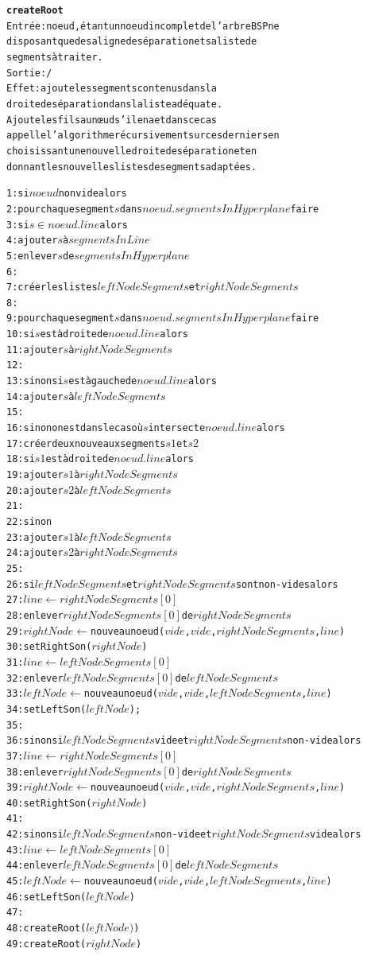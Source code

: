 \documentclass[11pt,a4paper]{article}
\theoremstyle{definition}
\theoremstyle{remark}
\begin{document}
\begin{alltt}
\textbf{createRoot}
Entrée : noeud, étant un noeud incomplet de l'arbre BSP ne
disposant que de sa ligne de séparation et sa liste de
segments à traiter.
Sortie : /
Effet : ajoute les segments contenus dans la 
droite de séparation dans la liste adéquate.
Ajoute les fils au nœud s'il en a et dans ce cas 
appelle l'algorithme récursivement sur ces derniers en 
choisissant une nouvelle droite de séparation et en 
donnant les nouvelles listes de segments adaptées.

 1: si \(noeud\) non vide alors
 2:   pour chaque segment \(s\) dans \(noeud.segmentsInHyperplane\) faire
 3:     si \(s \in noeud.line\) alors
 4:       ajouter \(s\) à \(segmentsInLine\)
 5:       enlever \(s\) de \(segmentsInHyperplane\)
 6:       
 7:   créer les listes \(leftNodeSegments\) et \(rightNodeSegments\)
 8:   
 9:   pour chaque segment \(s\) dans \(noeud.segmentsInHyperplane\) faire
10:     si \(s\) est à droite de \(noeud.line\) alors
11:       ajouter \(s\) à \(rightNodeSegments\)
12:
13:     sinon si \(s\) est à gauche de \(noeud.line\) alors
14:       ajouter \(s\) à \(leftNodeSegments\)
15:
16:     sinon on est dans le cas où \(s\) intersecte \(noeud.line\) alors
17:       créer deux nouveaux segments \(s1\) et \(s2\)
18:       si \(s1\) est à droite de \(noeud.line\) alors
19:         ajouter \(s1\) à \(rightNodeSegments\)
20:         ajouter \(s2\) à \(leftNodeSegments\)
21:
22:       sinon
23:         ajouter \(s1\) à \(leftNodeSegments\)
24:         ajouter \(s2\) à \(rightNodeSegments\)
25:         
26:   si \(leftNodeSegments\) et \(rightNodeSegments\) sont non-vides alors
27:     \(line \leftarrow rightNodeSegments[0]\)
28:     enlever \(rightNodeSegments[0]\) de \(rightNodeSegments\)
29:     \(rightNode \leftarrow\) nouveau noeud (\(vide\), \(vide\), \(rightNodeSegments\), \(line\))
30:     setRightSon(\(rightNode\))
31:     \(line \leftarrow leftNodeSegments[0]\)
32:     enlever \(leftNodeSegments[0]\) de \(leftNodeSegments\)
33:     \(leftNode \leftarrow\) nouveau noeud (\(vide\), \(vide\), \(leftNodeSegments\), \(line\))
34:     setLeftSon(\(leftNode\));
35:     
36:   sinon si \(leftNodeSegments\) vide et \(rightNodeSegments\) non-vide alors
37:     \(line \leftarrow rightNodeSegments[0]\)
38:     enlever \(rightNodeSegments[0]\) de \(rightNodeSegments\)
39:     \(rightNode \leftarrow \) nouveau noeud (\(vide\), \(vide\), \(rightNodeSegments\), \(line\))
40:     setRightSon(\(rightNode\))
41:    
42:   sinon si \(leftNodeSegments\) non-vide et \(rightNodeSegments\) vide alors
43:     \(line \leftarrow leftNodeSegments[0]\)
44:     enlever \(leftNodeSegments[0]\) de \(leftNodeSegments\)
45:     \(leftNode \leftarrow \) nouveau noeud (\(vide\), \(vide\), \(leftNodeSegments\), \(line\))
46:     setLeftSon(\(leftNode\))
47:     
48:   createRoot(\(leftNode)\))
49:   createRoot(\(rightNode\))
\end{alltt}
\end{document}
